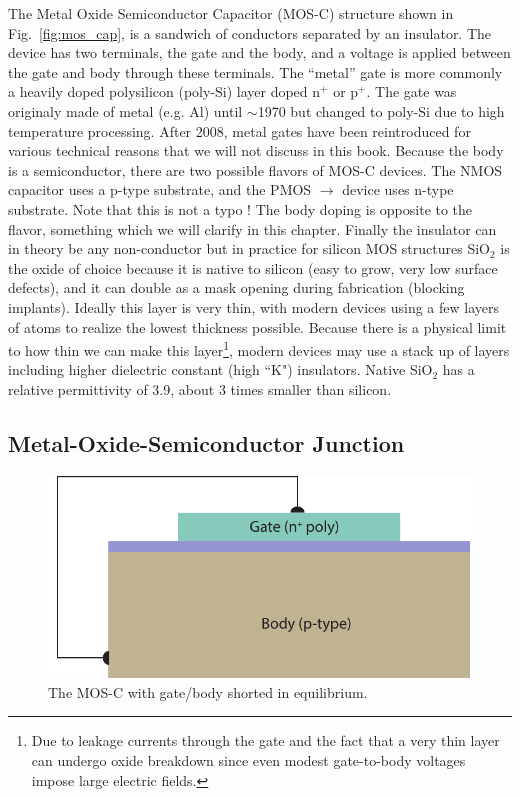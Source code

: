 The  Metal Oxide Semiconductor Capacitor (MOS-C) structure shown in Fig.~\ref{fig:mos_cap},  is a sandwich of conductors separated by an insulator.  The device has two terminals, the gate and the body, and a voltage is applied between the gate and body through these terminals.  The  “metal” gate is more commonly a heavily doped polysilicon (poly-Si) layer doped n$^+$ or p$^+$.  The gate was originaly made of metal (e.g. Al) until $\sim$1970 but changed to poly-Si due to high temperature processing. After 2008, metal gates have been reintroduced for various technical reasons that we will not discuss in this book.  Because the body is a semiconductor, there are two possible flavors of MOS-C devices.  The NMOS capacitor uses a  p-type substrate, and the PMOS  $\rightarrow$ device uses n-type substrate.  Note that this is not a typo !  The body doping is opposite to the flavor, something which we will clarify in this chapter.  Finally the insulator can in theory be any non-conductor but in practice for silicon MOS structures SiO$_2$ is the oxide of choice because it is native to silicon (easy to grow, very low surface defects), and it can double as a mask opening during fabrication (blocking implants).  Ideally this layer is very thin, with modern devices using a few layers of atoms to realize the lowest thickness possible.  Because there is a physical limit to how thin we can make this layer\footnote{Due to leakage currents through the gate and the fact that a very thin layer can undergo oxide breakdown since even modest gate-to-body voltages impose large electric fields.}, modern devices may use a stack up of layers including higher dielectric constant (high ``K") insulators.  Native SiO$_2$ has a relative permittivity of 3.9, about 3 times smaller than silicon.
\subsection{Metal-Oxide-Semiconductor Junction}
\begin{figure}[tbh]
\begin{center}
\includegraphics[width=.75\columnwidth]{mos_cap_wire_short}
\end{center}
\caption{The MOS-C with gate/body shorted in equilibrium. }
\label{fig:mos_cap_gate_body_short}
\end{figure}


